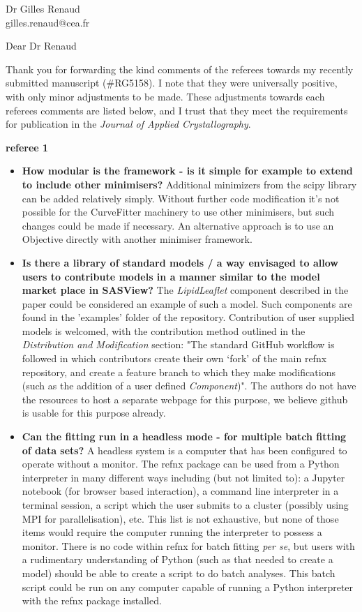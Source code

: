 \documentclass[fontsize=12pt, paper=a4]{scrlttr2}
\begin{document}
\begin{letter}{Dr Gilles Renaud \\ gilles.renaud@cea.fr}

\opening{Dear Dr Renaud}  %
Thank you for forwarding the kind comments of the referees towards my recently submitted manuscript (\#RG5158). I note that they were universally positive, with only minor adjustments to be made. These adjustments towards each referees comments are listed below, and I trust that they meet the requirements for publication in the \emph{Journal of Applied Crystallography}.


\textbf{referee 1}
\begin{itemize}
\item \textbf{How modular is the framework - is it simple for example to extend to include other minimisers?} Additional minimizers from the scipy library can be added relatively simply. Without further code modification it's not possible for the CurveFitter machinery to use other minimisers, but such changes could be made if necessary. An alternative approach is to use an Objective directly with another minimiser framework.
\item \textbf{Is there a library of standard models / a way envisaged to allow users to contribute models in a manner similar to the model market place in SASView?} The \emph{LipidLeaflet} component described in the paper could be considered an example of such a model. Such components are found in the 'examples' folder of the repository. Contribution of user supplied models is welcomed, with the contribution method outlined in the \emph{Distribution and Modification} section: "The standard GitHub workflow is followed in which contributors create their own `fork' of the main refnx repository, and create a feature branch to which they make modifications (such as the addition of a user defined \emph{Component})". The authors do not have the resources to host a separate webpage for this purpose, we believe github is usable for this purpose already.
\item \textbf{Can the fitting run in a headless mode - for multiple batch fitting of data sets?} A headless system is a computer that has been configured to operate without a monitor. The refnx package can be used from a Python interpreter in many different ways including (but not limited to): a Jupyter notebook (for browser based interaction), a command line interpreter in a terminal session, a script which the user submits to a cluster (possibly using MPI for parallelisation), etc. This list is not exhaustive, but none of those items would require the computer running the interpreter to possess a monitor. There is no code within refnx for batch fitting \emph{per se}, but users with a rudimentary understanding of Python (such as that needed to create a model) should be able to create a script to do batch analyses. This batch script could be run on any computer capable of running a Python interpreter with the refnx package installed.

\end{itemize}
\end{letter}
\end{document}
